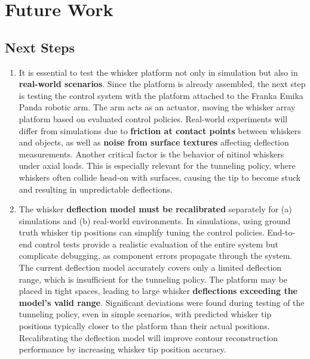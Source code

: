 \section{Future Work}

\subsection{Next Steps}
\begin{enumerate}
    \item It is essential to test the whisker platform not only in simulation but also in \textbf{real-world scenarios}.
    Since the platform is already assembled, the next step is testing the control system with the platform attached to the Franka Emika Panda robotic arm.
    The arm acts as an actuator, moving the whisker array platform based on evaluated control policies.
    Real-world experiments will differ from simulations due to \textbf{friction at contact points} between whiskers and objects, as well as \textbf{noise from surface textures} affecting deflection measurements.
    Another critical factor is the behavior of nitinol whiskers under axial loads.
    This is especially relevant for the tunneling policy, where whiskers often collide head-on with surfaces, causing the tip to become stuck and resulting in unpredictable deflections.

    \item The whisker \textbf{deflection model must be recalibrated} separately for (a) simulations and (b) real-world environments.
    In simulations, using ground truth whisker tip positions can simplify tuning the control policies.
    End-to-end control tests provide a realistic evaluation of the entire system but complicate debugging, as component errors propagate through the system.
    The current deflection model accurately covers only a limited deflection range, which is insufficient for the tunneling policy.
    The platform may be placed in tight spaces, leading to large whisker \textbf{deflections exceeding the model’s valid range}.
    Significant deviations were found during testing of the tunneling policy, even in simple scenarios, with predicted whisker tip positions typically closer to the platform than their actual positions.
    Recalibrating the deflection model will improve contour reconstruction performance by increasing whisker tip position accuracy.
\end{enumerate}

